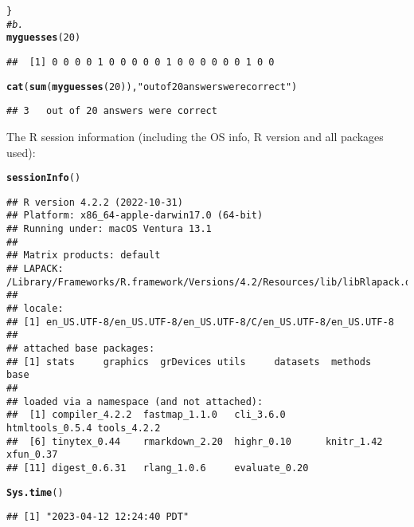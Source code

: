\documentclass{article}\usepackage[]{graphicx}\usepackage[]{xcolor}
\makeatletter
\newcommand{\hlnum}[1]{\textcolor[rgb]{0.686,0.059,0.569}{#1}}%
\newcommand{\hlstr}[1]{\textcolor[rgb]{0.192,0.494,0.8}{#1}}%
\newcommand{\hlcom}[1]{\textcolor[rgb]{0.678,0.584,0.686}{\textit{#1}}}%
\newcommand{\hlstd}[1]{\textcolor[rgb]{0.345,0.345,0.345}{#1}}%
\newcommand{\hlkwd}[1]{\textcolor[rgb]{0.737,0.353,0.396}{\textbf{#1}}}%
\newenvironment{kframe}{%
 \def\at@end@of@kframe{}%
 \ifinner\ifhmode%
  \def\at@end@of@kframe{\end{minipage}}%
  \begin{minipage}{\columnwidth}%
 \fi\fi%
 \def\FrameCommand##1{\hskip\@totalleftmargin \hskip-\fboxsep
 \colorbox{shadecolor}{##1}\hskip-\fboxsep
     \hskip-\linewidth \hskip-\@totalleftmargin \hskip\columnwidth}%
 \MakeFramed {\advance\hsize-\width
   \@totalleftmargin\z@ \linewidth\hsize
   \@setminipage}}%
 {\par\unskip\endMakeFramed%
 \at@end@of@kframe}
\newenvironment{knitrout}{}{} %
\makeatother
\begin{document}
\begin{knitrout}
\begin{kframe}
\begin{alltt}
\hlstd{\}}
\hlcom{#b. }
\hlkwd{myguesses}\hlstd{(}\hlnum{20}\hlstd{)}
\end{alltt}
\begin{verbatim}
##  [1] 0 0 0 0 1 0 0 0 0 0 1 0 0 0 0 0 0 1 0 0
\end{verbatim}
\begin{alltt}
\hlkwd{cat}\hlstd{(}\hlkwd{sum}\hlstd{(}\hlkwd{myguesses}\hlstd{(}\hlnum{20}\hlstd{)),} \hlstr{"  out of 20 answers were correct"}\hlstd{)}
\end{alltt}
\begin{verbatim}
## 3   out of 20 answers were correct
\end{verbatim}
\end{kframe}
\end{knitrout}

The R session information (including the OS info, R version and all
packages used):

\begin{knitrout}
\color{fgcolor}\begin{kframe}
\begin{alltt}
\hlkwd{sessionInfo}\hlstd{()}
\end{alltt}
\begin{verbatim}
## R version 4.2.2 (2022-10-31)
## Platform: x86_64-apple-darwin17.0 (64-bit)
## Running under: macOS Ventura 13.1
## 
## Matrix products: default
## LAPACK: /Library/Frameworks/R.framework/Versions/4.2/Resources/lib/libRlapack.dylib
## 
## locale:
## [1] en_US.UTF-8/en_US.UTF-8/en_US.UTF-8/C/en_US.UTF-8/en_US.UTF-8
## 
## attached base packages:
## [1] stats     graphics  grDevices utils     datasets  methods   base     
## 
## loaded via a namespace (and not attached):
##  [1] compiler_4.2.2  fastmap_1.1.0   cli_3.6.0       htmltools_0.5.4 tools_4.2.2    
##  [6] tinytex_0.44    rmarkdown_2.20  highr_0.10      knitr_1.42      xfun_0.37      
## [11] digest_0.6.31   rlang_1.0.6     evaluate_0.20
\end{verbatim}
\begin{alltt}
\hlkwd{Sys.time}\hlstd{()}
\end{alltt}
\begin{verbatim}
## [1] "2023-04-12 12:24:40 PDT"
\end{verbatim}
\end{kframe}
\end{knitrout}
\end{document}
